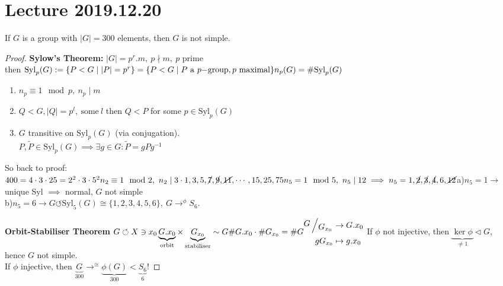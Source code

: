 \documentclass{article}
\let\ddd\cdots
\newcommand{\quotient}[2]{{\raisebox{.2em}{$#1$}\left/\raisebox{-.2em}{$#2$}\right.}}
\newcommand{\abs}[1]{\left|#1\right|}
\newcommand{\tsubgp}{\triangleleft}
\theoremstyle{definition}
\theoremstyle{remark}
\theoremstyle{example}
\begin{document}
	\section*{Lecture 2019.12.20}
	If $G$ is a group with $\abs{G}=300$ elements, then $G$ is not simple.
	\begin{proof}
		\textbf{Sylow's Theorem:} $\abs{G}=p^r.m,\ p \nmid m,\ p$ prime\\
		then $\mathrm{Syl}_p(G):=\{P<G \mid \abs{P} = p^r\} = \{P < G \mid P\ \mathrm{a}\ p\mathrm{-group}, p\ \mathrm{maximal} \}\\
		n_p(G)=\#\mathrm{Syl}_p(G)$
		\begin{enumerate}
			\item $n_p \equiv 1 \mod p,\ n_p \mid m$
			\item $Q < G, \abs{Q}=p^l,\ \mathrm{some}\ l$ then $Q < P$ for some $p \in \mathrm{Syl}_p(G)$
			\item $G$ transitive on $\mathrm{Syl}_p(G)$ (via conjugation).\\
			$P,\tilde{P} \in \mathrm{Syl}_p(G) \implies \exists g \in G : \tilde{P}=gPg^{-1}$
		\end{enumerate}
	
		So back to proof:\\
		$400=4\cdot3\cdot25=2^2\cdot3\cdot5^2\\
		n_2 \equiv 1 \mod 2,\ n_2 \mid 3 \cdot
		1,3,5,\cancel7, \cancel9, \cancel{11},\ddd,15,25,75\\
		n_5 = 1 \mod 5,\ n_5 \mid 12 \implies n_5 = 1, \cancel2, \cancel3, \cancel 4, 6, \cancel{12}\\
		$a)$n_5 = 1 \to $ unique Syl $\implies$ normal, $G$ not simple\\
		b)$n_5=6\to G \circlearrowleft\mathrm{Syl}_5(G) \cong \{1,2,3,4,5,6\},\ G \to^\phi S_6$.
		
		\textbf{Orbit-Stabiliser Theorem}
		$G \circlearrowleft X \ni x_0\\
		\underbrace{G.x_0}_{\mathrm{orbit}} \times \underbrace{G_{x_0}}_{\mathrm{stabiliser}} \sim G\\
		\#G.x_0 \cdot \# G_{x_0} = \# G\\\\
		\begin{aligned}
			\quotient{G}{G_{x_0}} &\to G.{x_0}\\
			gG_{x_0} & \mapsto g.x_0
		\end{aligned}\\\\
		$ If $\phi$ not injective, then $\underbrace{\ker \phi }_{\neq 1}\tsubgp G$, hence $G$ not simple.\\
		If $\phi$ injective, then $\underbrace{G}_{300} {\to^{\cong}} \underbrace{\phi(G)}_{300} < \underbrace{S_6}_6!$
		

\end{proof}
\end{document}
